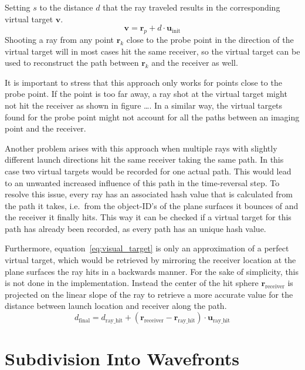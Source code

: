Setting \(s\) to the distance \(d\) that the ray traveled results in the corresponding virtual target \(\bm{v}\).
\begin{equation}\label{eq:visual_target}
    \bm{v} = \bm{r}_p + d \cdot \bm{u}_{\text{init}}
\end{equation}
Shooting a ray from any point \(\bm{r}_k\) close to the probe point in the direction of the virtual target will in most cases hit the same receiver, so the virtual target can be used to reconstruct the path between \(\bm{r}_k\) and the receiver as well.

It is important to stress that this approach only works for points close to the probe point.
If the point is too far away, a ray shot at the virtual target might not hit the receiver as shown in figure \ldots.
In a similar way, the virtual targets found for the probe point might not account for all the paths between an imaging point and the receiver.

Another problem arises with this approach when multiple rays with slightly different launch directions hit the same receiver taking the same path.
In this case two virtual targets would be recorded for one actual path.
This would lead to an unwanted increased influence of this path in the time-reversal step.
To resolve this issue, every ray has an associated hash value that is calculated from the path it takes, i.e.~from the object-ID's of the plane surfaces it bounces of and the receiver it finally hits.
This way it can be checked if a virtual target for this path has already been recorded, as every path has an unique hash value.

Furthermore, equation~\eqref{eq:visual_target} is only an approximation of a perfect virtual target, which would be retrieved by mirroring the receiver location at the plane surfaces the ray hits in a backwards manner.
For the sake of simplicity, this is not done in the implementation.
Instead the center of the hit sphere \(\bm{r}_{\text{receiver}}\) is projected on the linear slope of the ray to retrieve a more accurate value for the distance between launch location and receiver along the path.
\begin{equation}
    d_{\text{final}} = d_{\text{ray\_hit}} +  (\bm{r}_{\text{receiver}} - \bm{r}_{\text{ray\_hit}}) \cdot \bm{u}_{\text{ray\_hit}}
\end{equation}

\section{Subdivision Into Wavefronts}\label{section:subdivision_into_wavefronts}

